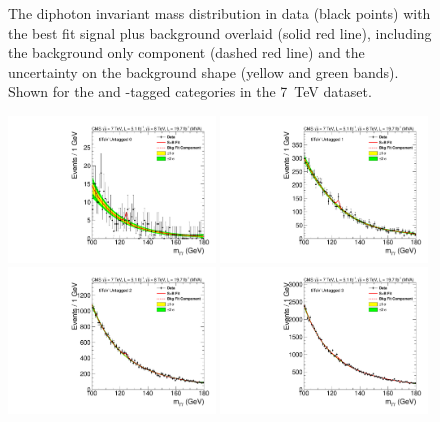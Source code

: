 \begin{figure}
  \caption[The diphoton invariant mass distribution in data with the best fit signal plus background overlaid for the \acs{VH} and \acs{ttH}-tagged categories in the 8~TeV dataset]{The diphoton invariant mass distribution in data (black points) with the best fit signal plus background overlaid (solid red line), including the background only component (dashed red line) and the uncertainty on the background shape (yellow and green bands). Shown for the \VH and \ttH-tagged categories in the 7~TeV dataset.}
  \label{fig:bfres2}
\end{figure}

\begin{figure}
  \vspace{-1cm}
  \includegraphics[width=0.49\textwidth]{results/plots/mgg-cats/mgg_mva_nosub_ch2_cat0_8TeV.pdf}
  \includegraphics[width=0.49\textwidth]{results/plots/mgg-cats/mgg_mva_nosub_ch2_cat1_8TeV.pdf}
  \includegraphics[width=0.49\textwidth]{results/plots/mgg-cats/mgg_mva_nosub_ch2_cat2_8TeV.pdf}
  \includegraphics[width=0.49\textwidth]{results/plots/mgg-cats/mgg_mva_nosub_ch2_cat3_8TeV.pdf}

\end{figure}
